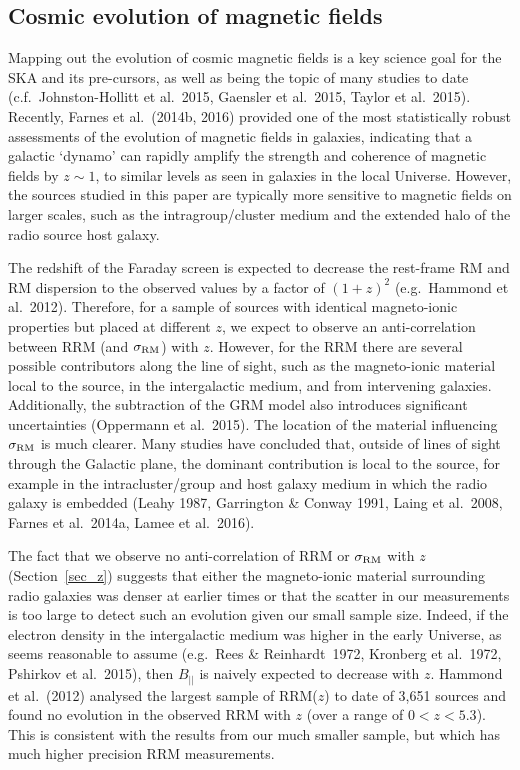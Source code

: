 \documentclass{mnras}
\newcommand*\sigmaRM{\sigma_{\rm RM}}
\begin{document}
\subsection{Cosmic evolution of magnetic fields}
Mapping out the evolution of cosmic magnetic fields is a key science goal for the SKA and its pre-cursors, as well as being the topic of many studies to date (c.f.~Johnston-Hollitt et al.~2015, Gaensler et al.~2015, Taylor et al.~2015). Recently, Farnes et al.~(2014b, 2016) provided one of the most statistically robust assessments of the evolution of magnetic fields in galaxies, indicating that a galactic `dynamo' can rapidly amplify the strength and coherence of magnetic fields by $z\sim1$, to similar levels as seen in galaxies in the local Universe. However, the sources studied in this paper are typically more sensitive to magnetic fields on larger scales, such as the intragroup/cluster medium and the extended halo of the radio source host galaxy. 

The redshift of the Faraday screen is expected to decrease the rest-frame RM and RM dispersion to the observed values by a factor of $(1+z)^2$ (e.g.~Hammond et al.~2012). Therefore, for a sample of sources with identical magneto-ionic properties but placed at different $z$, we expect to observe an anti-correlation between RRM (and $\sigmaRM$) with $z$. However, for the RRM there are several possible contributors along the line of sight, such as the magneto-ionic material local to the source, in the intergalactic medium, and from intervening galaxies. Additionally, the subtraction of the GRM model also introduces significant uncertainties (Oppermann et al.~2015). 
The location of the material influencing $\sigmaRM$ is much clearer. Many studies have concluded that, outside of lines of sight through the Galactic plane, the dominant contribution is local to the source, for example in the intracluster/group and host galaxy medium in which the radio galaxy is embedded (Leahy 1987, Garrington \& Conway 1991, Laing et al.~2008, Farnes et al.~2014a, Lamee et al.~2016). 

The fact that we observe no anti-correlation of RRM or $\sigmaRM$ with $z$ (Section~\ref{sec_z}) suggests that either the magneto-ionic material surrounding radio galaxies was denser at earlier times or that the scatter in our measurements is too large to detect such an evolution given our small sample size. Indeed,  if the electron density in the intergalactic medium was higher in the early Universe, as seems reasonable to assume (e.g.~Rees \& Reinhardt~1972, Kronberg et al.~1972, Pshirkov et al.~2015), then $B_{||}$ is naively expected to decrease with $z$. Hammond et al.~(2012) analysed the largest sample of RRM($z$) to date of 3,651 sources and found no evolution in the observed RRM with $z$ (over a range of $0<z<5.3$). This is consistent with the results from our much smaller sample, but which has much higher precision RRM measurements. 
\end{document}
